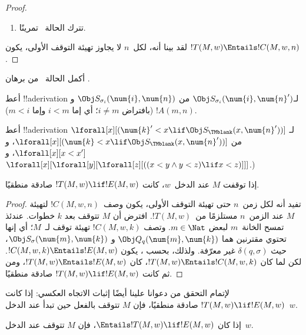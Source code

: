 \documentclass[../../../include/open-logic-section]{subfiles}
\begin{document}
\begin{proof}
\begin{enumerate}
\item تترك الحالة~ تمرينًا.
\end{enumerate}
لقد بينا أنه، لكل~$n$ لا يجاوز تهيئة التوقف الأولى، يكون
$!T(M,w)\Entails !C(M,w,n)$.
\end{proof}

\begin{prob}
أكمل الحالة~ من برهان
.
\end{prob}

\begin{prob}
أعط !!a{derivation} لـ$\Obj S_{\sigma_i}(\num{i},\num{n}')$ من
$\Obj S_{\sigma_i}(\num{i},\num{n})$ و$!A(m,n)$ (بافتراض
$i\neq m$؛ أي إما $i<m$ وإما $m<i$).
\end{prob}

\begin{prob}
أعط !!a{derivation} لـ
$\lforall[x][(\num{k}'<x\lif\Obj S_\TMblank(x,\num{n}'))]$ من
$\lforall[x][(\num{k}<x\lif\Obj S_\TMblank(x,\num{n}'))]$، و
$\lforall[x][x<x']$، و
$\lforall[x][\lforall[y][\lforall[z][((x<y\land y<z)\lif x<z)]]]$.)
\end{prob}


\begin{lem}
إذا توقفت $M$ عند الدخل~$w$، كانت $!T(M,w)\lif !E(M,w)$ صادقة
منطقيًا.
\end{lem}

\begin{proof}
تفيد  أنه لكل زمن~$n$ حتى تهيئة التوقف الأولى، يكون
وصف~$!C(M,w,n)$ لتهيئة $M$ عند الزمن~$n$ مستلزمًا من~$!T(M,w)$.
افترض أن $M$ تتوقف بعد $k$ خطوات. عندئذ تمسح الخانة~$m$ لبعض
$m\in\Nat$. وتصف $!C(M,w,k)$ تهيئة توقف لـ~$M$؛ أي إنها تحتوي
مقترنين هما $\Obj Q_q(\num{m},\num{k})$ و
$\Obj S_\sigma(\num{m},\num{k})$، حيث
$\delta(q,\sigma)$ غير معرّفة. ولذلك، بحسب
، يكون
$!C(M,w,k)\Entails !E(M,w)$. لكن لما كان
$!T(M,w)\Entails !C(M,w,k)$، كان $!T(M,w)\Entails !E(M,w)$، ومن ثم
كانت $!T(M,w)\lif !E(M,w)$ صادقة منطقيًا.
\end{proof}


\begin{explain}
لإتمام التحقق من دعوانا علينا أيضًا إثبات الاتجاه العكسي: إذا كانت
$!T(M,w)\lif !E(M,w)$ صادقة منطقيًا، فإن $M$ تتوقف بالفعل حين تبدأ
عند الدخل~$w$.
\end{explain}

\begin{lem}
إذا كان $\Entails !T(M,w)\lif !E(M,w)$، فإن $M$ تتوقف عند
الدخل~$w$.
\end{lem}
\end{document}
